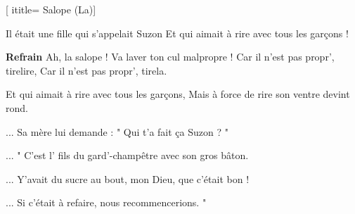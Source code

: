  [
ititle= {Salope (La)}]

\beginverse
Il était une fille qui s'appelait Suzon
Et qui aimait à rire avec tous les garçons !
\endverse

\beginchorus
\textbf {Refrain}
Ah, la salope ! Va laver ton cul malpropre !
Car il n'est pas propr', tirelire,
Car il n'est pas propr', tirela.
\endchorus

\beginverse
Et qui aimait à rire avec tous les garçons,
Mais à force de rire son ventre devint rond.
\endverse

\beginverse
... Sa mère lui demande : " Qui t'a fait ça Suzon ? "
\endverse

\beginverse
... " C'est l' fils du gard'-champêtre avec son gros bâton.
\endverse

\beginverse
... Y'avait du sucre au bout, mon Dieu, que c'était bon !
\endverse

\beginverse
... Si c'était à refaire, nous recommencerions. "
\endverse

\endsong